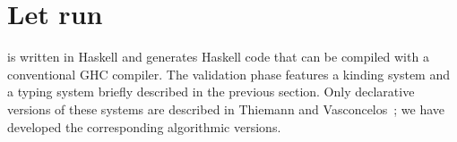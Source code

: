 \section{Let \freest{} run}
\label{sec:compiler}

\freest{} is written in Haskell and generates Haskell code that can be
compiled with a conventional GHC compiler.
%
The validation phase features a kinding system and a typing system
briefly described in the previous section. Only declarative versions
of these systems are described in Thiemann and
Vasconcelos~\cite{DBLP:conf/icfp/ThiemannV16}; we have developed the
corresponding algorithmic versions.

%
%
